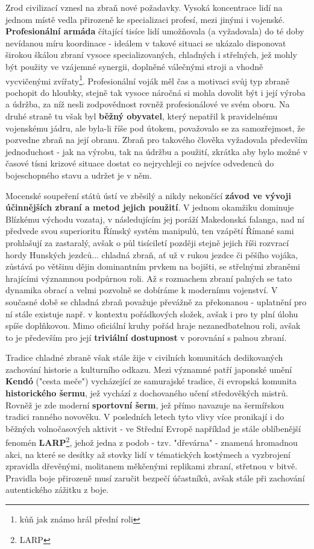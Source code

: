 Zrod civilizací vznesl na zbraň nové požadavky. Vysoká koncentrace lidí na jednom místě vedla přirozeně ke specializaci profesí, mezi jinými i vojenské. \textbf{Profesionální armáda} čítající tisíce lidí umožňovala (a vyžadovala) do té doby nevídanou míru koordinace - ideálem v takové situaci se ukázalo disponovat širokou škálou zbraní vysoce specializovaných, chladných i střelných, jež mohly být použity ve vzájemné synergii, doplněné válečnými stroji a vhodně vycvičenými zvířaty\footnote{kůň jak známo hrál přední roli}. Profesionální voják měl čas a motivaci svůj typ zbraně pochopit do hloubky, stejně tak vysoce náročná si mohla dovolit být i její výroba a údržba, za níž nesli zodpovědnost rovněž profesionálové ve svém oboru. 
Na druhé straně tu však byl \textbf{běžný obyvatel}, který nepatřil k pravidelnému vojenskému jádru, ale byla-li říše pod útokem, považovalo se za samozřejmost, že pozvedne zbraň na její obranu. Zbraň pro takového člověka vyžadovala především jednoduchost - jak na výrobu, tak na údržbu a použití, zkrátka aby bylo možné v časové tísni krizové situace dostat co nejrychleji co nejvíce odvedenců do bojeschopného stavu a udržet je v něm.

Mocenské soupeření států ústí ve zběsilý a nikdy nekončící \textbf{závod ve vývoji účinnějších zbraní a metod jejich použití}. V jednom okamžiku dominuje Blízkému východu vozataj, v následujícím jej poráží Makedonská falanga, nad ní předvede svou superioritu Římský systém manipulů, ten vzápětí Římané sami prohlašují za zastaralý, avšak o půl tisíciletí později stejně jejich říši rozvrací hordy Hunských jezdců... chladná zbraň, ať už v rukou jezdce či pěšího vojáka, zůstává po většinu dějin dominantním prvkem na bojišti, se střelnými zbraněmi hrajícími významnou podpůrnou roli. Až s rozmachem zbraní palných se tato dynamika obrací a velmi pozvolně se dobíráme k modernímu vojenství. V současné době se chladná zbraň považuje převážně za překonanou - uplatnění pro ní stále existuje např. v kontextu pořádkových složek, avšak i pro ty plní úlohu spíše doplňkovou. Mimo oficiální kruhy pořád hraje nezanedbatelnou roli, avšak to je především pro její \textbf{triviální dostupnost} v porovnání s palnou zbraní.

Tradice chladné zbraně však stále žije v civilních komunitách dedikovaných zachování historie a kulturního odkazu. Mezi významné patří japonské umění \textbf{Kendó} ("cesta meče") vycházející ze samurajské tradice, či evropská komunita \textbf{historického šermu}, jež vychází z dochovaného učení středověkých mistrů. Rovněž je zde moderní \textbf{sportovní šerm}, jež přímo navazuje na šermířskou tradici ranného novověku. V posledních letech tyto vlivy více pronikají i do běžných volnočasových aktivit - ve Střední Evropě například je stále oblíbenější fenomén \textbf{LARP}\footnote{\ac{LARP}}, jehož jedna z podob - tzv. "dřevárna" - znamená hromadnou akci, na které se desítky až stovky lidí v tématických kostýmech a vyzbrojení zpravidla dřevěnými, molitanem měkčenými replikami zbraní, střetnou v bitvě. Pravidla boje přirozeně musí zaručit bezpečí účastníků, avšak stále při zachování autentického zážitku z boje.  

